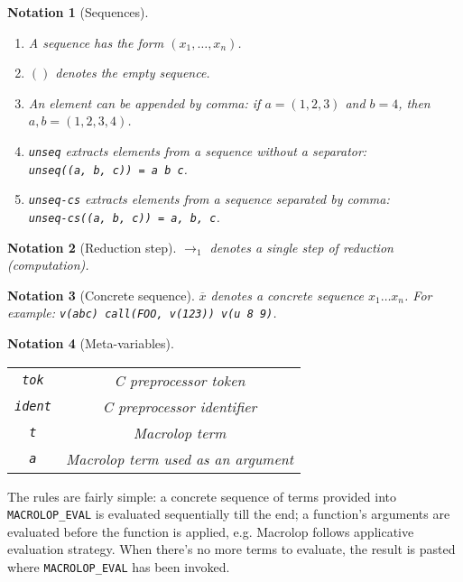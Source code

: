 \documentclass[12pt]{article}
\theoremstyle{break}
\newtheorem{notation}{Notation}
\begin{document}
\begin{notation}[Sequences]
    \label{SequencesNotation}
    \begin{enumerate}
        \item A sequence has the form $(x_1, \ldots, x_n)$.
        \item $()$ denotes the empty sequence.
        \item An element can be appended by comma: if $a = (1, 2, 3)$ and $b = 4$, then $a, b = (1, 2, 3, 4)$.
        \item \texttt{unseq} extracts elements from a sequence without a separator: \\
        \texttt{unseq((a, b, c)) = a b c}.
        \item \texttt{unseq-cs} extracts elements from a sequence separated by comma: \\
        \texttt{unseq-cs((a, b, c)) = a, b, c}.
    \end{enumerate}
\end{notation}

\begin{notation}[Reduction step]
    $\to_1$ denotes a single step of reduction (computation).
\end{notation}

\begin{notation}[Concrete sequence]
    \label{ConcreteSequenceNotation}
    $\overline{x}$ denotes a concrete sequence $x_1 \ldots x_n$. For example:
    \texttt{v(abc) call(FOO, v(123)) v(u 8 9)}.
\end{notation}

\begin{notation}[Meta-variables]
    \ \\
    \begin{tabular}{|c|c|}
        \hline
        \texttt{tok} & C preprocessor token \\
        \texttt{ident} & C preprocessor identifier \\
        \texttt{t} & Macrolop term \\
        \texttt{a} & Macrolop term used as an argument \\
        \hline
    \end{tabular}
\end{notation}

The rules are fairly simple: a concrete sequence of terms provided into
\texttt{MACROLOP\_EVAL} is evaluated sequentially till the end; a function's arguments
are evaluated before the function is applied, e.g. Macrolop follows applicative
evaluation strategy. When there's no more terms to evaluate, the result is pasted
where \texttt{MACROLOP\_EVAL} has been invoked.
\end{document}
